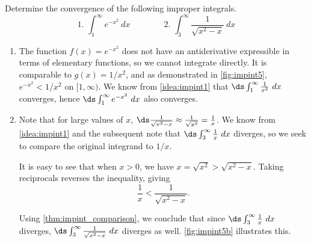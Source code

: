 \begin{example}\label{ex_impint5}
Determine the convergence of the following improper integrals.
\[
 \text{1. }\int_1^\infty e^{-x^2}\ dx\qquad\qquad
 \text{2. }\int_3^\infty \frac{1}{\sqrt{x^2-x}}\ dx
\]
\solution
\begin{enumerate}
\item		The function $f(x) = e^{-x^2}$ does not have an antiderivative expressible in terms of elementary functions, so we cannot integrate directly. It is comparable to $g(x)=1/x^2$, and as demonstrated in \autoref{fig:impint5}, $e^{-x^2} < 1/x^2$ on $[1,\infty)$. We know from \autoref{idea:impint1} that $\ds \int_1^\infty \frac{1}{x^2}\ dx$ converges, hence $\ds\int_1^\infty e^{-x^2}\ dx$ also converges.


\item		Note that for large values of $x$, $\ds \frac{1}{\sqrt{x^2-x}} \approx \frac{1}{\sqrt{x^2}} =\frac{1}{x}$. We know from \autoref{idea:impint1} and the subsequent note that  $\ds \int_3^\infty \frac1x\ dx$ diverges, so we seek to compare the original integrand to $1/x$.

It is easy to see that when $x>0$, we have $x = \sqrt{x^2} > \sqrt{x^2-x}$. Taking reciprocals reverses the inequality, giving
\[\frac1x < \frac1{\sqrt{x^2-x}}.\]

Using \autoref{thm:impint_comparison}, we conclude that since $\ds\int_3^\infty\frac1x\ dx$ diverges, $\ds\int_3^\infty\frac1{\sqrt{x^2-x}}\ dx$ diverges as well. \autoref{fig:impint5b} illustrates this.\eoehere


\end{enumerate}
\end{example}
